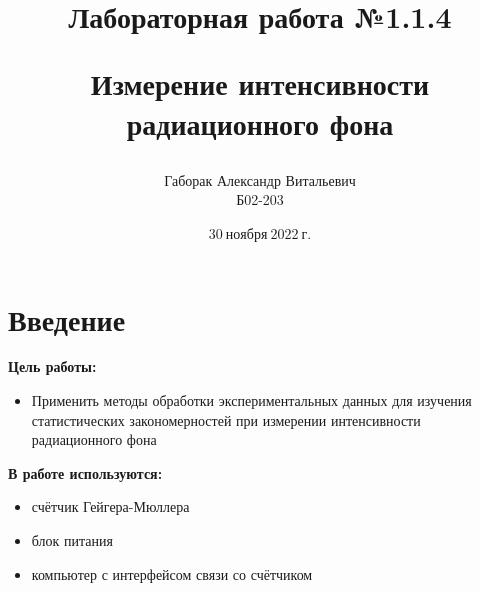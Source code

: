 \documentclass[a4paper, 12pt]{article}
\title{\begin{center}Лабораторная работа №1.1.4\end{center}
Измерение интенсивности радиационного фона}
\author{Габорак Александр Витальевич \\ Б02-203}
\date{$30 \ ноября \ 2022 \ г.$}
\begin{document}
    \maketitle
    \newpage

    \section{Введение}
    \textbf{Цель работы:}
    \begin{itemize}
        \item Применить методы обработки экспериментальных данных для изучения статистических закономерностей при измерении интенсивности радиационного фона
    \end{itemize}

    \vspace{1cm}

    \textbf{В работе используются: }
    \begin{itemize}
        \item счётчик Гейгера-Мюллера
        \item блок питания
        \item компьютер с интерфейсом связи со счётчиком
   \end{itemize}
\end{document}
